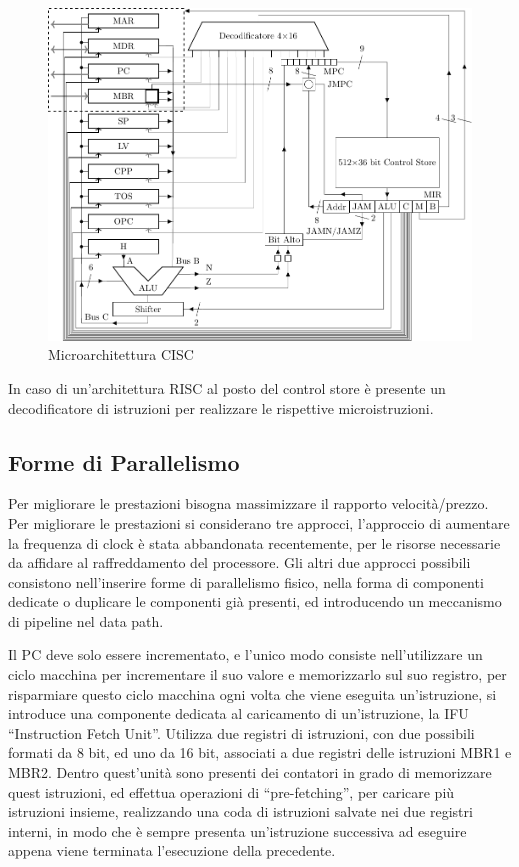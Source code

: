 \documentclass{article}
\numberwithin{equation}{subsection}
\begin{document}
\begin{figure}[H]%
    \centering
    \includegraphics[scale=0.89]{processore-cisc-jvm.pdf}%
    \caption{Microarchitettura CISC}%
\end{figure}

In caso di un'architettura RISC al posto del control store è presente un decodificatore di istruzioni per realizzare le 
rispettive microistruzioni. 

\subsection{Forme di Parallelismo}

Per migliorare le prestazioni bisogna massimizzare il rapporto velocità/prezzo. Per migliorare le prestazioni si considerano tre approcci, l'approccio di aumentare la frequenza 
di clock è stata abbandonata recentemente, per le risorse necessarie da affidare al raffreddamento del processore. Gli altri due approcci possibili consistono nell'inserire 
forme di parallelismo fisico, nella forma di componenti dedicate o duplicare le componenti già presenti, ed introducendo un meccanismo di pipeline nel data path.  


Il PC deve solo essere incrementato, e l'unico modo consiste nell'utilizzare un ciclo macchina per incrementare il suo valore e memorizzarlo sul suo registro, per risparmiare 
questo ciclo macchina ogni volta che viene eseguita un'istruzione, si introduce una componente dedicata al caricamento di un'istruzione, la IFU ``Instruction Fetch Unit''. 
Utilizza due registri di istruzioni, con due possibili formati da 8 bit, ed uno da 16 bit, associati a due registri delle istruzioni MBR1 e MBR2. Dentro quest'unità sono presenti dei contatori in grado di memorizzare quest istruzioni, 
ed effettua operazioni di ``pre-fetching'', per caricare più istruzioni insieme, realizzando una coda di istruzioni salvate nei due registri interni, in modo che è sempre 
presenta un'istruzione successiva ad eseguire appena viene terminata l'esecuzione della precedente. 
\end{document}
